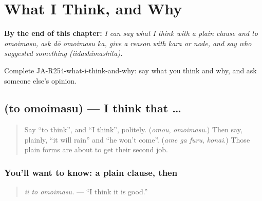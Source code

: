 
\chapter{What I Think, and Why}
\label{ch:ja-what-i-think-and-why}

\begin{chapteropening}
\textbf{By the end of this chapter:} \emph{I can say what I think with a plain clause and to omoimasu, ask dō omoimasu ka, give a reason with kara or node, and say who suggested something (iidashimashita).}

Complete JA-R254-what-i-think-and-why: say what you think and why, and ask someone else's opinion.
\end{chapteropening}

\section[\texorpdfstring{\ja{と} \ja{おもいます} (to omoimasu)}{と おもいます (to omoimasu)}]{  (to omoimasu) — I think that …}

\label{lesson:JA-C254-to-omoimasu}



\begin{quote}
Say \textquotedblleft{}to think\textquotedblright{}, and \textquotedblleft{}I think\textquotedblright{}, politely. (\emph{omou}, \emph{omoimasu}.) Then say, plainly, \textquotedblleft{}it will rain\textquotedblright{} and \textquotedblleft{}he won't come\textquotedblright{}. (\emph{ame ga furu}, \emph{konai}.) Those plain forms are about to get their second job.
\end{quote}

\subsection*{You'll want to know: a plain clause, then }
\begin{quote}
\textbf{ }
\end{quote}

\begin{quote}
\emph{ii to omoimasu.} — \textquotedblleft{}I think it is good.\textquotedblright{}
\end{quote}


